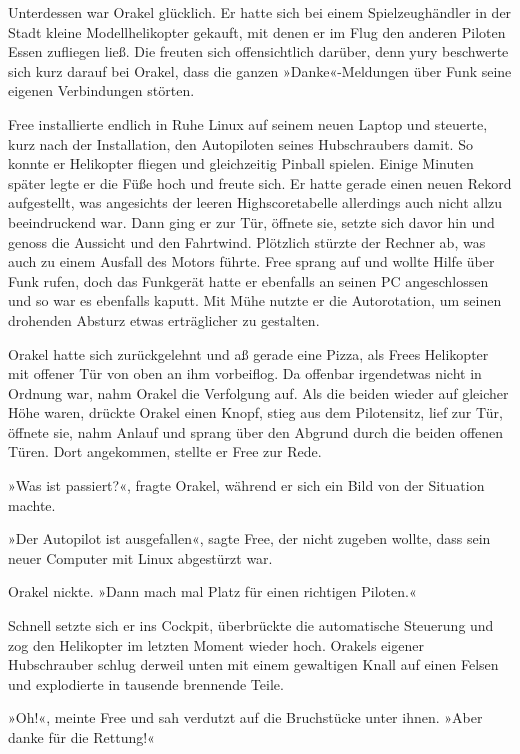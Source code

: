 Unterdessen war Orakel glücklich. Er hatte sich bei einem Spielzeughändler in der Stadt kleine Modellhelikopter gekauft, mit denen er im Flug den anderen Piloten Essen zufliegen ließ. Die freuten sich offensichtlich darüber, denn yury beschwerte sich kurz darauf bei Orakel, dass die ganzen »Danke«-Meldungen über Funk seine eigenen Verbindungen störten.

Free installierte endlich in Ruhe Linux auf seinem neuen Laptop und steuerte, kurz nach der Installation, den Autopiloten seines Hubschraubers damit. So konnte er Helikopter fliegen und gleichzeitig Pinball spielen. Einige Minuten später legte er die Füße hoch und freute sich. Er hatte gerade einen neuen Rekord aufgestellt, was angesichts der leeren Highscoretabelle allerdings auch nicht allzu beeindruckend war. Dann ging er zur Tür, öffnete sie, setzte sich davor hin und genoss die Aussicht und den Fahrtwind. Plötzlich stürzte der Rechner ab, was auch zu einem Ausfall des Motors führte. Free sprang auf und wollte Hilfe über Funk rufen, doch das Funkgerät hatte er ebenfalls an seinen PC angeschlossen und so war es ebenfalls kaputt. Mit Mühe nutzte er die Autorotation, um seinen drohenden Absturz etwas erträglicher zu gestalten.

Orakel hatte sich zurückgelehnt und aß gerade eine Pizza, als Frees Helikopter mit offener Tür von oben an ihm vorbeiflog. Da offenbar irgendetwas nicht in Ordnung war, nahm Orakel die Verfolgung auf. Als die beiden wieder auf gleicher Höhe waren, drückte Orakel einen Knopf, stieg aus dem Pilotensitz, lief zur Tür, öffnete sie, nahm Anlauf und sprang über den Abgrund durch die beiden offenen Türen. Dort angekommen, stellte er Free zur Rede.

»Was ist passiert?«, fragte Orakel, während er sich ein Bild von der Situation machte.

»Der Autopilot ist ausgefallen«, sagte Free, der nicht zugeben wollte, dass sein neuer Computer mit Linux abgestürzt war.

Orakel nickte. »Dann mach mal Platz für einen richtigen Piloten.«

Schnell setzte sich er ins Cockpit, überbrückte die automatische Steuerung und zog den Helikopter im letzten Moment wieder hoch. Orakels eigener Hubschrauber schlug derweil unten mit einem gewaltigen Knall auf einen Felsen und explodierte in tausende brennende Teile.

»Oh!«, meinte Free und sah verdutzt auf die Bruchstücke unter ihnen. »Aber danke für die Rettung!«

